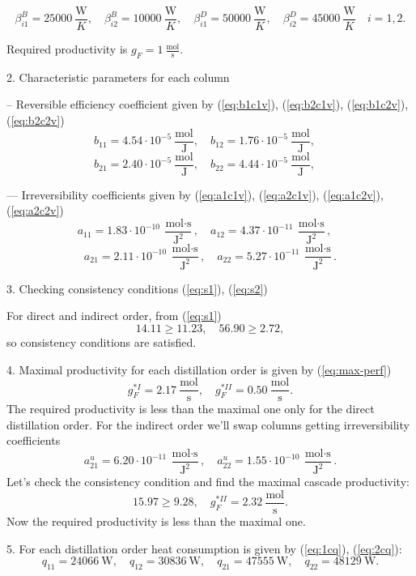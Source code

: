 \documentclass[12pt]{article}
\begin{document}
$$
\beta^B_{i1} = 25000\: \frac{\mbox{W}}{K},\quad
\beta^B_{i2} = 10000\: \frac{\mbox{W}}{K},\quad
\beta^D_{i1} = 50000\: \frac{\mbox{W}}{K},\quad
\beta^D_{i2} = 45000\: \frac{\mbox{W}}{K}\quad i=1,2.
$$

Required productivity is
$
g_F = 1\:\frac{\mbox{mol}}{\mbox{s}}.
$

2. Characteristic parameters for each column

-- Reversible efficiency coefficient given by (\ref{eq:b1c1v}), (\ref{eq:b2c1v}), (\ref{eq:b1c2v}), (\ref{eq:b2c2v})
$$
b_{11} = 4.54\cdot10^{-5}\: \frac{\mbox{mol}}{\mbox{J}},\quad
b_{12} = 1.76\cdot10^{-5}\: \frac{\mbox{mol}}{\mbox{J}},\quad
$$
$$
b_{21} = 2.40\cdot10^{-5}\: \frac{\mbox{mol}}{\mbox{J}},\quad
b_{22} = 4.44\cdot10^{-5}\: \frac{\mbox{mol}}{\mbox{J}},\quad
$$

--- Irreversibility coefficients given by (\ref{eq:a1c1v}), (\ref{eq:a2c1v}), (\ref{eq:a1c2v}), (\ref{eq:a2c2v})
$$
a_{11} = 1.83\cdot10^{-10}\: \frac{\mbox{mol}\cdot\mbox{s}}{\mbox{J}^2},\quad
a_{12} = 4.37\cdot10^{-11}\: \frac{\mbox{mol}\cdot\mbox{s}}{\mbox{J}^2},\quad
$$
$$
a_{21} = 2.11\cdot10^{-10}\: \frac{\mbox{mol}\cdot\mbox{s}}{\mbox{J}^2},\quad
a_{22} = 5.27\cdot10^{-11}\: \frac{\mbox{mol}\cdot\mbox{s}}{\mbox{J}^2}.
$$

3. Checking consistency conditions (\ref{eq:s1}), (\ref{eq:s2})

For direct and indirect order, from (\ref{eq:s1})
$$
14.11 \geq 11.23,\quad 56.90 \geq 2.72,
$$
so consistency conditions are satisfied.

4. Maximal productivity for each distillation order is given by (\ref{eq:max-perf})
$$
g_{F}^{*I} = 2.17\: \frac{\mbox{mol}}{\mbox{s}},\quad
g_{F}^{*II} = 0.50\: \frac{\mbox{mol}}{\mbox{s}}.
$$
The required productivity is less than the maximal one only for the direct distillation order. For the indirect order we'll swap columns getting irreversibility coefficients
$$
a_{21}^u = 6.20\cdot10^{-11}\: \frac{\mbox{mol}\cdot\mbox{s}}{\mbox{J}^2},\quad
a_{22}^u = 1.55\cdot10^{-10}\: \frac{\mbox{mol}\cdot\mbox{s}}{\mbox{J}^2}.
$$
Let's check the consistency condition and find the maximal cascade productivity:
$$
15.97 \geq 9.28,\quad g_F^{*II} = 2.32\: \frac{\mbox{mol}}{\mbox{s}}.
$$
Now the required productivity is less than the maximal one.

5. For each distillation order heat consumption is given by (\ref{eq:1cq}), (\ref{eq:2cq}):
$$
q_{11} = 24066\:\mbox{W},\quad q_{12} = 30836\:\mbox{W},\quad q_{21} = 47555\:\mbox{W},\quad q_{22} = 48129\:\mbox{W}.
$$
\end{document}
